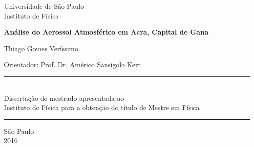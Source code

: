 \begin{titlepage}
\setlength{\voffset}{0pt}
\setlength{\hoffset}{0pt}
\centering
\Large{Universidade de São Paulo \\
Instituto de Física}


\LARGE{\bf Análise do Aerossol Atmosférico em Acra, Capital de Gana
}


\Large{ Thiago Gomes Veríssimo
}


\begin{flushright}

\begin{minipage}{.6\textwidth}
\large{Orientador: Prof. Dr. Américo Sansigolo Kerr
}
\end{minipage}


\begin{minipage}{.6\textwidth}
\rule{\linewidth}{0.5mm}\\
\large{
Dissertação de mestrado apresentada ao \\ Instituto de Física para a obtenção do 
título de Mestre em Física
}

\rule{\linewidth}{0.5mm}
\end{minipage}
\end{flushright}


\begin{flushleft}

\normalsize

\hspace{.03\textwidth}


\end{flushleft}


São Paulo\\
2016

\end{titlepage}

